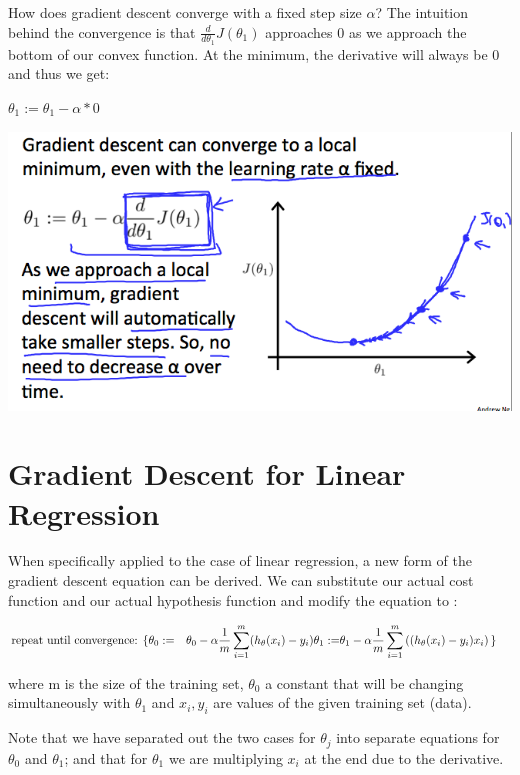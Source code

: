 \documentclass[
]{book}
\begin{document}
How does gradient descent converge with a fixed step size \(\alpha\)?
The intuition behind the convergence is that \(\frac{d}{d\theta_1} J(\theta_1)\) approaches 0 as we approach the bottom of our convex function. At the minimum, the derivative will always be 0 and thus we get:

\(\theta_1:=\theta_1-\alpha * 0\)

\includegraphics{Gradien_Descent_Intution_graph_3.png}

\hypertarget{gradient-descent-for-linear-regression}{%
\section{Gradient Descent for Linear Regression}\label{gradient-descent-for-linear-regression}}

When specifically applied to the case of linear regression, a new form of the gradient descent equation can be derived. We can substitute our actual cost function and our actual hypothesis function and modify the equation to :

\begin{align} \text{repeat until convergence: } \lbrace & \newline \theta_0 := & \theta_0 - \alpha \frac{1}{m} \sum\limits_{i=1}^{m}(h_\theta(x_{i}) - y_{i}) \newline \theta_1 := & \theta_1 - \alpha \frac{1}{m} \sum\limits_{i=1}^{m}\left((h_\theta(x_{i}) - y_{i}) x_{i}\right) \newline \rbrace& \end{align}

where m is the size of the training set, \(\theta_0\) a constant that will be changing simultaneously with \(\theta_1\) and \(x_{i}, y_{i}\) are values of the given training set (data).

Note that we have separated out the two cases for \(\theta_j\) into separate equations for \(\theta_0\) and \(\theta_1\); and that for \(\theta_1\) we are multiplying \(x_{i}\) at the end due to the derivative.
\end{document}
